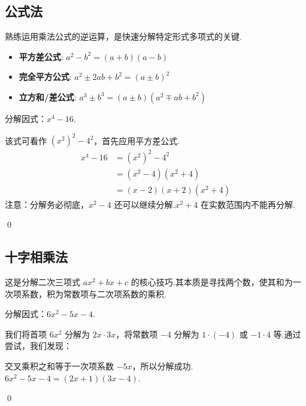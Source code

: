 	\subsection{公式法}
	熟练运用乘法公式的逆运算，是快速分解特定形式多项式的关键.
	\begin{itemize}
		\item \textbf{平方差公式}: $a^2-b^2=(a+b)(a-b)$
		\item \textbf{完全平方公式}: $a^2 \pm 2ab + b^2 = (a \pm b)^2$
		\item \textbf{立方和/差公式}: $a^3 \pm b^3 = (a \pm b)(a^2 \mp ab + b^2)$
	\end{itemize}
	\begin{exercise}
		分解因式：$x^4 - 16$.
	\end{exercise}
	\begin{solution}
		该式可看作 $(x^2)^2 - 4^2$，首先应用平方差公式.
		\begin{align*}
			x^4 - 16 &= (x^2)^2 - 4^2 \\
			&= (x^2-4)(x^2+4) \\
			&= (x-2)(x+2)(x^2+4)
		\end{align*}
		注意：分解务必彻底，$x^2-4$ 还可以继续分解.$x^2+4$ 在实数范围内不能再分解.
	\end{solution}
	\qed
	
	\subsection{十字相乘法}
	这是分解二次三项式 $ax^2+bx+c$ 的核心技巧.其本质是寻找两个数，使其和为一次项系数，积为常数项与二次项系数的乘积.
	\begin{exercise}
		分解因式：$6x^2 - 5x - 4$.
	\end{exercise}
	\begin{solution}
		我们将首项 $6x^2$ 分解为 $2x \cdot 3x$，将常数项 $-4$ 分解为 $1 \cdot (-4)$ 或 $-1 \cdot 4$ 等.通过尝试，我们发现：
		\begin{center}
		\end{center}
		交叉乘积之和等于一次项系数 $-5x$，所以分解成功.
		$6x^2 - 5x - 4 = (2x+1)(3x-4)$.
	\end{solution}
	\qed
	
